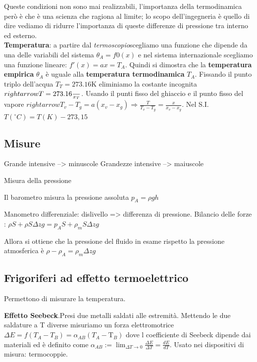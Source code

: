 \documentclass[a4paper]{article}
\numberwithin{equation}{section}%
\begin{document}
Queste condizioni non sono mai realizzabili, l’importanza della termodinamica però è che è una scienza che ragiona al limite; lo scopo dell’ingegneria è quello di dire vediamo di ridurre l’importanza di queste differenze di pressione tra interno ed esterno.
\\

\textbf{Temperatura}: a partire dal \textit{termoscopio}scegliamo una funzione che dipende da una delle variabili del sistema $\theta_A=f0(x)$ e nel sistema internazionale scegliamo una funzione lineare: $f'(x)=ax=T_A$. Quindi si dimostra che la \textbf{temperatura empirica} $\theta _A$ è uguale alla \textbf{temperatura termodinamica} $T_A$. Fissando il punto triplo dell'acqua $T_T=273.16 \text{K}$ eliminiamo la costante incognita  $rightarrow  T=273.16 {\over x_T}$. Usando il punti fisso del ghiaccio e il punto fisso del vapore $rightarrow T_{v}-T_{g}=a\left(x_{v}-x_{g}\right) \Rightarrow \frac{T}{T_{v}-T_{g}}=\frac{x}{x_{v}-x_{g}} $. Nel  S.I.$T\left({ }^{\circ} C\right)=T(K)-273,15$


\subsection{Misure}

Grande intensive --> minuscole
Grandezze intensive --> maiuscole

Misura della pressione 

Il barometro misura la pressione assoluta $p_A=\rho g h$

Manometro differenziale: dislivello => differenza di pressione. Bilancio delle forze : $ \rho S+\rho S\Delta z g=p_AS+\rho_m S\Delta z g$
 
Allora si ottiene che la pressione del fluido in esame rispetto la pressione atmosferica è $\rho -\rho_A=\rho_m \Delta zg$ 

\subsection{Frigoriferi ad effetto termoelettrico}


Permettono di misurare la temperatura. 

\textbf{Effetto Seebeck}.Presi due metalli saldati alle estremità. Mettendo le due saldature a T diverse misuriamo un forza elettromotrice $\Delta E=f\left(T_A-T_B\right)=\alpha_{A B}\left(T_{A}-\mathrm{T}_{B}\right) $ dove l coefficiente di Seebeck dipende dai materiali ed è definito come $\alpha_{A B}:=\lim _{\Delta T \rightarrow 0} \frac{\Delta E}{\Delta T}=\frac{d E}{d T}$. Usato nei dispositivi di misura: termocoppie. 
\end{document}
